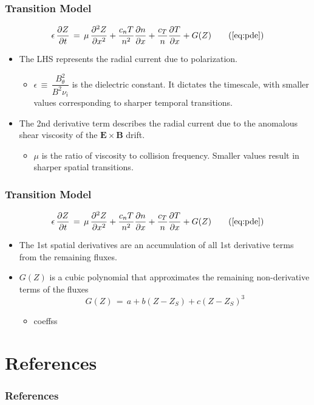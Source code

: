 \documentclass{beamer}
\begin{document}
\begin{frame}
\frametitle{Transition Model}
\begin{equation}
	\epsilon\,\frac{\partial Z}{\partial t} \,=\, \mu\,\frac{\partial^2 Z}{\partial x^2} + \frac{c_n T}{n^2} \frac{\partial n}{\partial x} + \frac{c_T}{n} \frac{\partial T}{\partial x} + G(Z) \tag{\ref{eq:pde}}
\end{equation}
	\begin{itemize}
		\item The LHS represents the radial current due to polarization.
		\begin{itemize}
			\item $\epsilon \,\equiv\, \dfrac{B_\theta^2}{B^2 \nu_i}$ is the dielectric constant.
			It dictates the timescale, with smaller values corresponding to sharper temporal transitions.
		\end{itemize}
		\item The 2nd derivative term describes the radial current due to the anomalous shear viscosity of the $\mathbf{E}\times\mathbf{B}$ drift.
		\begin{itemize}
			\item $\mu$ is the ratio of viscosity to collision frequency. Smaller values result in sharper spatial transitions.
		\end{itemize}
	\end{itemize}
\end{frame}


\begin{frame}
\frametitle{Transition Model}
\begin{equation}
	\epsilon\,\frac{\partial Z}{\partial t} \,=\, \mu\,\frac{\partial^2 Z}{\partial x^2} + \frac{c_n T}{n^2} \frac{\partial n}{\partial x} + \frac{c_T}{n} \frac{\partial T}{\partial x} + G(Z) \tag{\ref{eq:pde}}
\end{equation}
	\begin{itemize}
		\item The 1st spatial derivatives are an accumulation of all 1st derivative terms from the remaining fluxes.
		\item $G(Z)$ is a cubic polynomial that approximates the remaining non-derivative terms of the fluxes
		\begin{equation}
			G(Z) \,=\, a + b(Z - Z_S) + c(Z - Z_S)^3
			\label{eq:G_func}
		\end{equation}
		\begin{itemize}
			\item coeffss
		\end{itemize}
	\end{itemize}
\end{frame}

\section{References}
\begin{frame}
\frametitle{References}
\renewcommand*{\bibfont}{\scriptsize}
\printbibliography
\end{frame}
\end{document}
